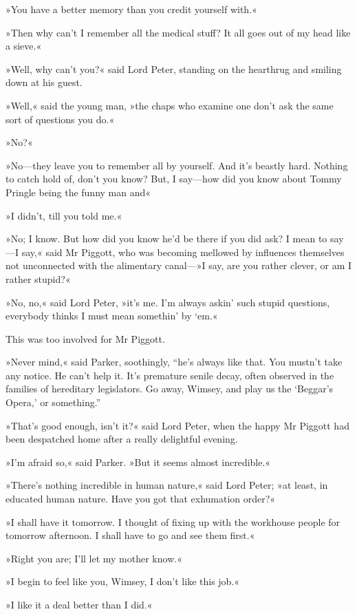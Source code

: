 »You have a better memory than you credit yourself with.«

»Then why can't I remember all the medical stuff? It all goes out of my head like a sieve.«

»Well, why can't you?« said Lord Peter, standing on the hearthrug and smiling down at his guest.

»Well,« said the young man, »the chaps who examine one don't ask the same sort of questions you do.«

»No?«

»No—they leave you to remember all by yourself. And it's beastly hard. Nothing to catch hold of, don't you know? But, I say—how did you know about Tommy Pringle being the funny man and\longdash«

»I didn't, till you told me.«

»No; I know. But how did you know he'd be there if you did ask? I mean to say—I say,« said Mr Piggott, who was becoming mellowed by influences themselves not unconnected with the alimentary canal---»I say, are you rather clever, or am I rather stupid?«

»No, no,« said Lord Peter, »it's me. I'm always askin' such stupid questions, everybody thinks I must mean somethin' by `em.«

This was too involved for Mr Piggott.

»Never mind,« said Parker, soothingly, “he's always like that. You mustn't take any notice. He can't help it. It's premature senile decay, often observed in the families of hereditary legislators. Go away, Wimsey, and play us the ‘Beggar's Opera,' or something.”

»That's good enough, isn't it?« said Lord Peter, when the happy Mr Piggott had been despatched home after a really delightful evening.

»I'm afraid so,« said Parker. »But it seems almost incredible.«

»There's nothing incredible in human nature,« said Lord Peter; »at least, in educated human nature. Have you got that exhumation order?«

»I shall have it tomorrow. I thought of fixing up with the workhouse people for tomorrow afternoon. I shall have to go and see them first.«

»Right you are; I'll let my mother know.«

»I begin to feel like you, Wimsey, I don't like this job.«

»I like it a deal better than I did.«

